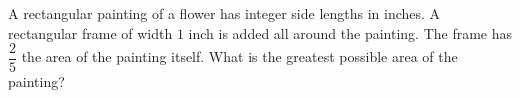 A rectangular painting of a flower has integer side lengths in inches. A rectangular frame of width $1$ inch is added all around the painting. The frame has $\dfrac25$ the area of the painting itself. What is the greatest possible area of the painting?
